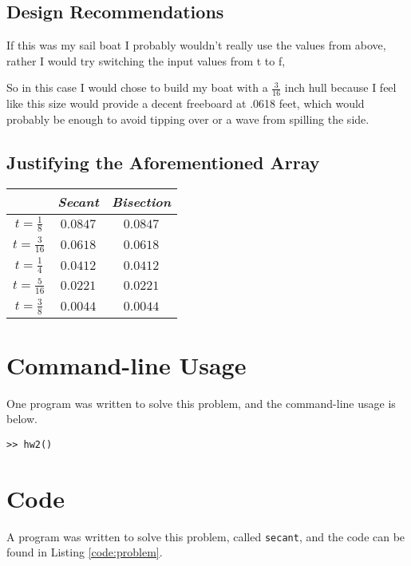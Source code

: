 \documentclass[11pt]{article}
\begin{document}
\subsection{Design Recommendations}
If this was my sail boat I probably wouldn't really use the values from above, rather I would try switching the input values from t to f, 



So in this case I would chose to build my boat with a $\frac{3}{16}$ inch hull because I feel like this size would provide a decent freeboard at .0618 feet, which would probably be enough to avoid tipping over or a wave from spilling the side.

\subsection{Justifying the Aforementioned Array}

\begin{center}
    \begin{tabular}{|c|c|c|}
        \hline
         & \emph{Secant}&\emph{Bisection} \\
         \hline
          $t=\frac{1}{8}$&$0.0847$ & $0.0847$\\
         $t=\frac{3}{16}$&$0.0618$&$0.0618$ \\
         $t=\frac{1}{4}$&$0.0412$&$0.0412$\\
         $t=\frac{5}{16}$&$0.0221$&$0.0221$\\
         $t=\frac{3}{8}$&$0.0044$&$0.0044$\\
         \hline
    \end{tabular}
\end{center}



\section{Command-line Usage}
One program was written to solve this problem, and the command-line usage is below.

\begin{verbatim}
>> hw2()
\end{verbatim}

\section{Code}

A program was written to solve this problem, called \texttt{secant}, and the code can be found in Listing \ref{code:problem}.








\end{document}
